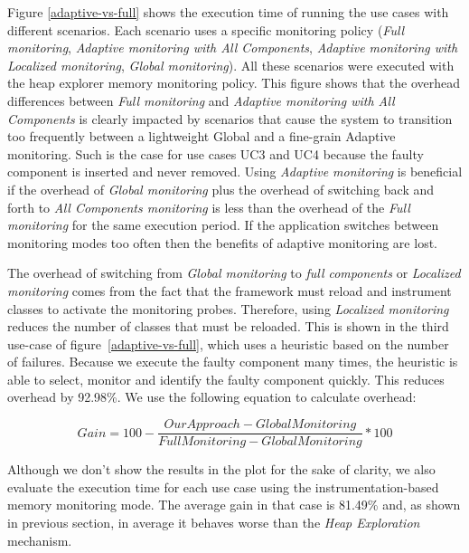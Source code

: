Figure \ref{adaptive-vs-full} shows the execution time of running the use cases with different scenarios.
Each scenario uses a specific monitoring policy (\emph{Full monitoring}, \emph{Adaptive monitoring with All Components}, \emph{Adaptive monitoring with Localized monitoring}, \emph{Global monitoring}).
All these scenarios were executed with the heap explorer memory monitoring policy. 
This figure shows that the overhead differences between \textit{Full monitoring} and \emph{Adaptive monitoring with All Components} is clearly impacted by scenarios that cause the system to transition too frequently between a lightweight Global and a fine-grain Adaptive monitoring.
Such is the case for use cases UC3 and UC4 because the faulty component is inserted and never removed.
Using \emph{Adaptive monitoring} is beneficial if the overhead of \emph{Global monitoring} plus the overhead of switching back and forth to \emph{All Components monitoring} is less than the overhead of the \emph{Full monitoring} for the same execution period.
If the application switches between monitoring modes too often then the benefits of adaptive monitoring are lost.

The overhead of switching from \emph{Global monitoring} to \emph{full components} or \emph{Localized monitoring} comes from the fact that the framework must reload and instrument classes to activate the monitoring probes.
Therefore, using \emph{Localized monitoring} reduces the number of classes that must be reloaded.
This is shown in the third use-case of figure~\ref{adaptive-vs-full}, which uses a heuristic based on the number of failures.
Because we execute the faulty component many times, the heuristic is able to select, monitor and identify the faulty component quickly. This reduces overhead by 92.98\%. We use the following equation to calculate overhead:

\[ Gain=100-\frac{OurApproach-GlobalMonitoring}{FullMonitoring-GlobalMonitoring}*100 \]

Although we don't show the results in the plot for the sake of clarity, we also evaluate the execution time for each use case using the instrumentation-based memory monitoring mode.
The average gain in that case is 81.49\% and, as shown in previous section, in average it behaves worse than the \textit{Heap Exploration} mechanism.

